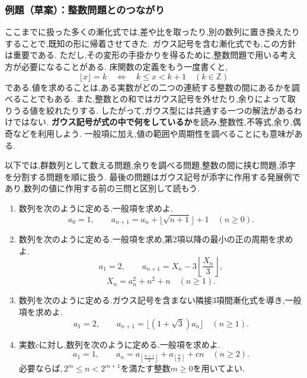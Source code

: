   \subsubsection{例題（草案）：整数問題とのつながり}\label{節：ガウス型の例題草案}
    ここまでに扱った多くの漸化式では,差や比を取ったり,別の数列に置き換えたりすることで,既知の形に帰着させてきた.
    ガウス記号を含む漸化式でも,この方針は重要である.
    ただし,その変形の手掛かりを得るために,整数問題で用いる考え方が必要になることがある.
    床関数の定義をもう一度書くと,
    \[
      \lfloor x\rfloor=k
      \quad\Longleftrightarrow\quad
      k\le x<k+1\quad(k\in\mathbb Z)
    \]
    である.値を求めることは,ある実数がどの二つの連続する整数の間にあるかを調べることでもある.
    また,整数との和ではガウス記号を外せたり,余りによって取りうる値を絞れたりする.
    したがって,ガウス型には共通する一つの解法があるわけではない.
    \textbf{ガウス記号が式の中で何をしているか}を読み,整数性,不等式,余り,偶奇などを利用しよう.
    一般項に加え,値の範囲や周期性を調べることにも意味がある.

    以下では,群数列として数える問題,余りを調べる問題,整数の間に挟む問題,添字を分割する問題を順に扱う.
    最後の問題はガウス記号が添字に作用する発展例であり,数列の値に作用する前の三問と区別して読もう.

    \noindent {}
    \begin{enumerate}[label=(\arabic*),parsep=3pt,format=\bookitemlink{example-gauss-integer-draft}{problem}{answer}]
      \item 数列を次のように定める.一般項を求めよ.
            \[
              a_0=1,\qquad
              a_{n+1}=a_n+\lfloor\sqrt{n+1}\rfloor+1
              \quad(n\ge0).
            \]
      \item 数列を次のように定める.一般項を求め,第2項以降の最小の正の周期を求めよ.
            \[
              a_1=2,\qquad
              a_{n+1}=X_n-3\left\lfloor\frac{X_n}{3}\right\rfloor,
            \]
            \[
              X_n=a_n^2+n^2+n\quad(n\ge1).
            \]
      \item 数列を次のように定める.ガウス記号を含まない隣接3項間漸化式を導き,一般項を求めよ.
            \[
              a_1=2,\qquad
              a_{n+1}=\lfloor(1+\sqrt3)a_n\rfloor
              \quad(n\ge1).
            \]
      \item 実数$c$に対し,数列を次のように定める.一般項を求めよ.
            \[
              a_1=1,\qquad
              a_n=a_{\left\lfloor\frac{n+1}{2}\right\rfloor}
                  +a_{\left\lfloor\frac n2\right\rfloor}+cn
              \quad(n\ge2).
            \]
            必要ならば,\,$2^m\le n<2^{m+1}$を満たす整数$m\ge0$を用いてよい.
    \end{enumerate}

